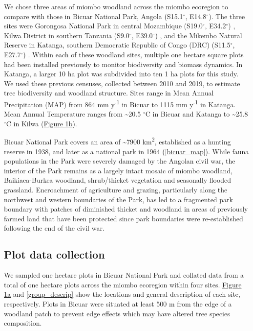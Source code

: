 \documentclass[diversity,article,submit,moreauthors,pdftex]{Definitions/mdpi}
\begin{document}
We chose three areas of miombo woodland across the miombo ecoregion to compare with those in Bicuar National Park, Angola (S15.1$^\circ$, E14.8$^\circ$). The three sites were Gorongosa National Park in central Mozambique (S19.0$^\circ$, E34.2$^\circ$) \citep{Ryan2011}, Kilwa District in southern Tanzania (S9.0$^\circ$, E39.0$^\circ$) \citep{McNicol2018}, and the Mikembo Natural Reserve in Katanga, southern Democratic Republic of Congo (DRC) (S11.5$^\circ$, E27.7$^\circ$) \citep{Muledi2017}. Within each of these woodland sites, multiple one hectare square plots had been installed previously to monitor biodiversity and biomass dynamics.  In Katanga, a larger 10 ha plot was subdivided into ten 1 ha plots for this study. We used these previous censuses, collected between 2010 and 2019, to estimate tree biodiversity and woodland structure. Sites range in Mean Annual Precipitation (MAP) from 864 mm y\textsuperscript{-1} in Bicuar to 1115 mm y\textsuperscript{-1} in Katanga. Mean Annual Temperature ranges from \textasciitilde{}20.5 $^\circ$C in Bicuar and Katanga to \textasciitilde{}25.8 $^\circ$C in Kilwa (\hyperref[temp_precip]{Figure 1b}).

Bicuar National Park covers an area of \textasciitilde{}7900 km\textsuperscript{2}, established as a hunting reserve in 1938, and later as a national park in 1964 (\autoref{bicuar_map}). While fauna populations in the Park were severely damaged by the Angolan civil war, the interior of the Park remains as a largely intact mosaic of miombo woodland, Baikiaea-Burkea woodland, shrub/thicket vegetation and seasonally flooded grassland. Encroachment of agriculture and grazing, particularly along the northwest and western boundaries of the Park, has led to a fragmented park boundary with patches of diminished thicket and woodland in areas of previously farmed land that have been protected since park boundaries were re-established following the end of the civil war.

\subsection{Plot data collection}

We sampled \nplotsbicuar{} one hectare plots in Bicuar National Park and collated data from a total of \nplots{} one hectare plots across the miombo ecoregion within four sites. \hyperref[plot_map]{Figure 1a} and \autoref{group_descrip} show the locations and general description of each site, respectively. Plots in Bicuar were situated at least 500 m from the edge of a woodland patch to prevent edge effects which may have altered tree species composition.
\end{document}
